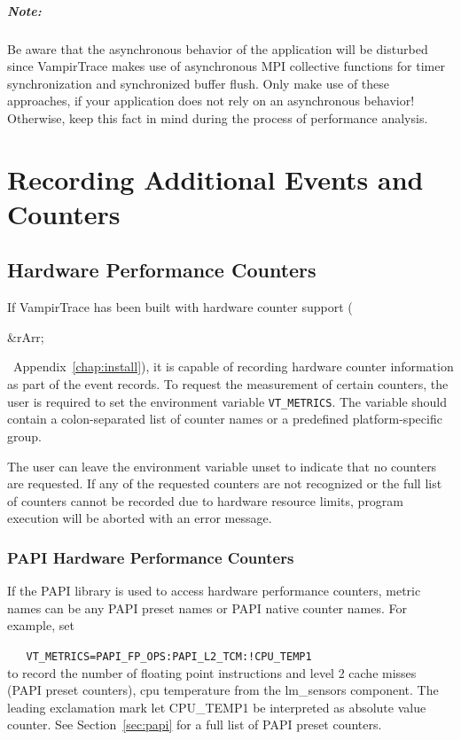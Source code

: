\documentclass[a4paper,twoside,12pt,BCOR12mm]{scrbook}
\newcommand{\rarr}{$\Rightarrow$}  %
\renewcommand{\rarr}{\begin{rawhtml}&rArr;\end{rawhtml}}   %
\begin{document}
  \paragraph{Note:}
  Be aware that the asynchronous behavior of the application will be disturbed since VampirTrace
  makes use of asynchronous MPI collective functions for timer synchronization and synchronized
  buffer flush.\newline
  Only make use of these approaches, if your application does not rely on an asynchronous behavior!
  Otherwise, keep this fact in mind during the process of performance analysis.


\chapter{Recording Additional Events and Counters}


\section{Hardware Performance Counters}
\label{sec:hw_perf_counters}

  If VampirTrace has been built with hardware counter support (\rarr\ 
  Appendix~\ref{chap:install}), it is capable of recording hardware counter
  information as part of the event records. To request the measurement of
  certain counters, the user is required to set the environment variable \texttt{VT\_METRICS}.
  The variable should contain a colon-separated list of counter names
  or a predefined platform-specific group.

  The user can leave the environment variable unset to indicate that no
  counters are requested. If any of the requested counters are not recognized
  or the full list of counters cannot be recorded due to hardware resource
  limits, program execution will be aborted with an error message.

\subsection*{PAPI Hardware Performance Counters}

  If the PAPI library is used to access hardware performance counters,
  metric names can be any PAPI preset names or PAPI native counter names. 
  For example, set
  
  \vspace{1ex}
  \verb|   VT_METRICS=PAPI_FP_OPS:PAPI_L2_TCM:!CPU_TEMP1|
  \vspace{1ex}\\
  to record the number of floating point instructions and level 2 cache misses (PAPI preset counters), 
  cpu temperature from the lm\_sensors component.
  The leading exclamation mark let CPU\_TEMP1 be interpreted as absolute value counter.
  See Section~\ref{sec:papi} for a full list of PAPI preset counters.
\end{document}

